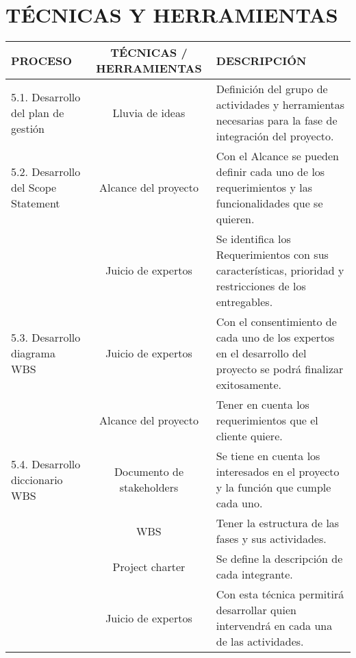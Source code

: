 \chapter{T\'ECNICAS Y HERRAMIENTAS}
%
\begin{table}[H]
	\centering
	\begin{tabular}{| m{5cm} | c | p{5cm} |}
	\hline
	\rowcolor{LightGrey}
	\textbf{PROCESO} & \textbf{T\'ECNICAS / HERRAMIENTAS} & \textbf{DESCRIPCI\'ON} \\ \hline
	5.1. Desarrollo del plan de gesti\'on & Lluvia de ideas & Definici\'on del grupo de actividades y herramientas 
	necesarias para la fase de integraci\'on del proyecto.\\
	\hline
	5.2. Desarrollo del Scope Statement & Alcance del proyecto & Con el Alcance se pueden definir cada uno de los 
	requerimientos y las funcionalidades que se quieren.\\ 
	  \cline{2-3}
	 & Juicio de expertos & Se identifica los Requerimientos con sus caracter\'isticas, prioridad y restricciones 
	 de los entregables. \\
	\hline
	5.3. Desarrollo diagrama WBS & Juicio de expertos & Con el consentimiento  de cada uno de los expertos en el 
	desarrollo del proyecto  se podr\'a finalizar exitosamente.\\
	\cline{2-3}
	& Alcance del proyecto & Tener en cuenta  los  requerimientos que el cliente quiere.\\
	\hline
	5.4. Desarrollo diccionario WBS & Documento de stakeholders & Se tiene en cuenta los interesados en el proyecto 
	y la funci\'on que cumple cada uno.\\
	\cline{2-3}
	& WBS & Tener la estructura de las fases y sus actividades.\\
	\cline{2-3}
	& Project charter & Se define la descripci\'on de cada integrante.\\
	\cline{2-3}
	& Juicio de expertos & Con esta t\'ecnica permitir\'a desarrollar quien intervendr\'a en cada una de las 
	actividades.\\
	\hline
	\end{tabular}
	
\end{table}